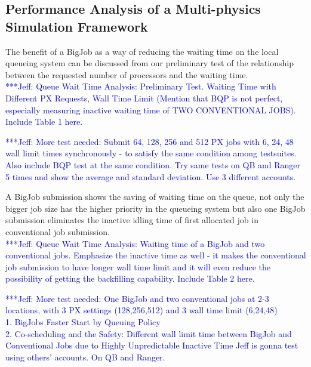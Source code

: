 \documentclass[conference,final]{IEEEtran}
\newcommand{\skonote}[1]{ {\textcolor{blue} { ***Jeff: #1 }}}
\newcommand{\skonote}[1]{}
\begin{document}
\subsection{Performance Analysis of a Multi-physics Simulation Framework}

The benefit of a BigJob as a way of reducing the waiting time on the local queueing system can be discussed from our preliminary test of the relationship between the requested number of processors and the waiting time.\\
\skonote{Queue Wait Time Analysis: Preliminary Test. Waiting Time with Different PX Requests, Wall Time Limit
(Mention that BQP is not perfect, especially measuring inactive waiting time of TWO CONVENTIONAL JOBS). Include Table 1 here.}
\newline
\newline

\skonote{More test needed: Submit 64, 128, 256 and 512 PX jobs with 6, 24, 48 wall limit times synchronously - to satisfy the same condition among testsuites. Also include BQP test at the same condition. Try same tests on QB and Ranger 5 times and show the average and standard deviation. Use 3 different accounts.\\}
\newline
\newline


A BigJob submission shows the saving of waiting time on the queue, not only the bigger job size has the higher priority in the queueing system but also one BigJob submission eliminates the inactive idling time of first allocated job in conventional job submission.\\
\skonote{Queue Wait Time Analysis: Waiting time of a BigJob and two conventional jobs. Emphasize the inactive time as well - it makes the conventional job submission to have longer wall time limit and it will even reduce the possibility of getting the backfilling capability. Include Table 2 here.}
\newline
\newline

\skonote{More test needed: One BigJob and two conventional jobs at 2-3 locations, with 3 PX settings (128,256,512) and 3 wall time limit (6,24,48)\\
  1. BigJobs Faster Start by Queuing Policy\\
  2. Co-scheduling and the Safety: Different wall limit time between BigJob and Conventional Jobs due to Highly Unpredictable Inactive Time
  Jeff is gonna test using others' accounts. On QB and Ranger.}
\newline
\newline
\end{document}
